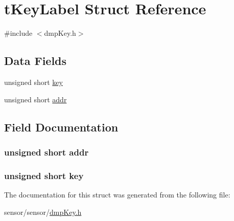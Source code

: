 \hypertarget{structt_key_label}{}\section{t\+Key\+Label Struct Reference}
\label{structt_key_label}


{\ttfamily \#include $<$dmp\+Key.\+h$>$}

\subsection*{Data Fields}
\begin{DoxyCompactItemize}
\item 
unsigned short \hyperlink{structt_key_label_ad42a2de4cc8381513f980278161372bb}{key}
\item 
unsigned short \hyperlink{structt_key_label_af2d98bb0b152ca3d254d1c534236c2e6}{addr}
\end{DoxyCompactItemize}


\subsection{Field Documentation}
\subsubsection[{\texorpdfstring{addr}{addr}}]{\setlength{\rightskip}{0pt plus 5cm}unsigned short addr}\hypertarget{structt_key_label_af2d98bb0b152ca3d254d1c534236c2e6}{}\label{structt_key_label_af2d98bb0b152ca3d254d1c534236c2e6}
\subsubsection[{\texorpdfstring{key}{key}}]{\setlength{\rightskip}{0pt plus 5cm}unsigned short key}\hypertarget{structt_key_label_ad42a2de4cc8381513f980278161372bb}{}\label{structt_key_label_ad42a2de4cc8381513f980278161372bb}


The documentation for this struct was generated from the following file\+:\begin{DoxyCompactItemize}
\item 
sensor/sensor/\hyperlink{dmp_key_8h}{dmp\+Key.\+h}\end{DoxyCompactItemize}
